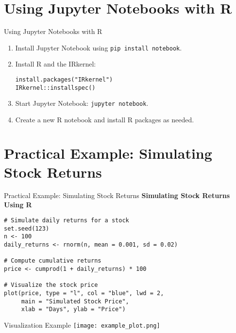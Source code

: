 \documentclass{beamer}
\begin{document}
\section{Using Jupyter Notebooks with R}
\begin{frame}{Using Jupyter Notebooks with R}
\begin{enumerate}
    \item Install Jupyter Notebook using \texttt{pip install notebook}.
    \item Install R and the IRkernel:
    \begin{verbatim}
install.packages("IRkernel")
IRkernel::installspec()
    \end{verbatim}
    \item Start Jupyter Notebook: \texttt{jupyter notebook}.
    \item Create a new R notebook and install R packages as needed.
\end{enumerate}
\end{frame}

\section{Practical Example: Simulating Stock Returns}
\begin{frame}[fragile]{Practical Example: Simulating Stock Returns}
\textbf{Simulating Stock Returns Using R}
\begin{verbatim}
# Simulate daily returns for a stock
set.seed(123)
n <- 100
daily_returns <- rnorm(n, mean = 0.001, sd = 0.02)

# Compute cumulative returns
price <- cumprod(1 + daily_returns) * 100

# Visualize the stock price
plot(price, type = "l", col = "blue", lwd = 2,
     main = "Simulated Stock Price",
     xlab = "Days", ylab = "Price")
\end{verbatim}
\end{frame}

\begin{frame}{Visualization Example}
\centering
\texttt{[image: example\_plot.png]} %
\end{frame}
\end{document}
